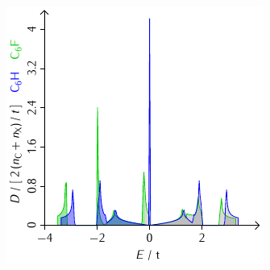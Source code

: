 \documentclass{beamer}
\begin{document}
\begin{frame}
\begin{minipage}{0.48\textwidth}
		\end{minipage}
		\hfill
		\begin{minipage}{0.48\textwidth}
			\includegraphics[width=\textwidth]{Abbildungen/Bandstrukturen/DOS_C6X.pdf}
		\end{minipage}
	\end{frame}
	
\end{document}
